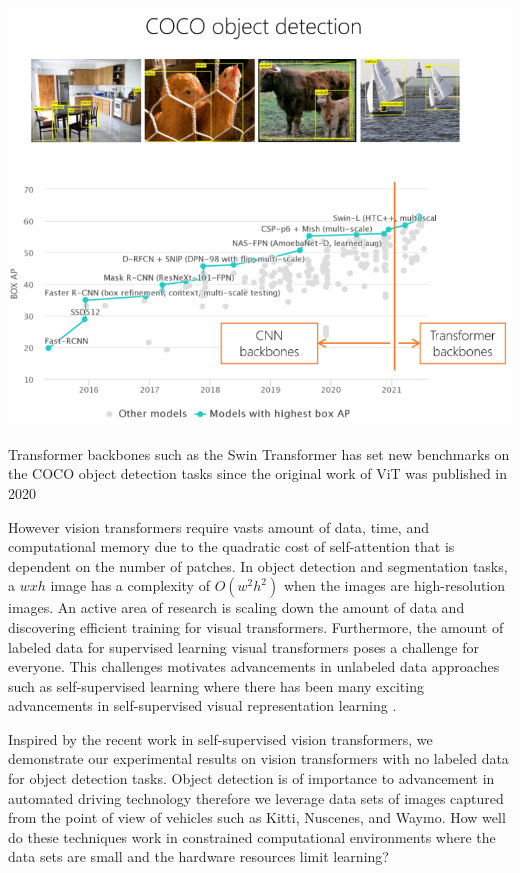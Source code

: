 \documentclass[10pt,twocolumn,letterpaper]{article}
\begin{document}
\includegraphics[width=0.8\linewidth]{docs/latex/images/ViT-progression.png}
\caption{Transformer backbones such as the Swin Transformer has set new benchmarks on the COCO object detection tasks since the original work of ViT was published in 2020}


However vision transformers require vasts amount of data, time, and computational memory due to the quadratic cost of self-attention that is dependent on the number of patches. In object detection and segmentation tasks, a $wxh$ image has a complexity of $O(w^2h^2)$ when the images are high-resolution images. An active area of research is scaling down the amount of data and discovering efficient training for visual transformers\cite{liu2021efficient}\cite{lee2021vision}. Furthermore, the amount of labeled data for supervised learning visual transformers poses a challenge for everyone. This challenges motivates advancements in unlabeled data approaches such as self-supervised learning where there has been many exciting advancements in self-supervised visual representation learning  \cite{chen2020simple} \cite{he2020momentum} \cite{henaff2020dat} \cite{chen2020improved} \cite{caron2020unsupervised} \cite{grill2020bootstrap}.

Inspired by the recent work in self-supervised vision transformers\cite{caron2021emerging}, we demonstrate our experimental results on vision transformers with no labeled data for object detection tasks. Object detection is of importance to advancement in automated driving technology therefore we leverage data sets of images captured from the point of view of vehicles such as Kitti\cite{Geiger2012CVPR}, Nuscenes\cite{nuscenes2019}, and Waymo. How well do these techniques work in constrained computational environments where the data sets are small and the hardware resources limit learning?
\end{document}
